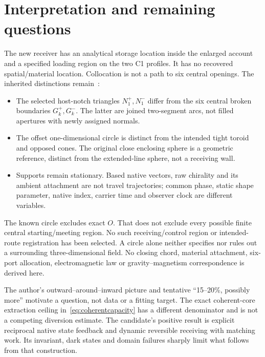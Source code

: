 \section{Interpretation and remaining questions}\label{sec:interpretation}
The new receiver has an analytical storage location inside the enlarged account and a specified loading region on the two C1 profiles. It has no recovered spatial/material location. Collocation is not a path to six central openings. The inherited distinctions remain~\cite{recirculation}:
\begin{itemize}
\item The selected host-notch triangles $N_1^+,N_1^-$ differ from the six central broken boundaries $G_k^+,G_k^-$. The latter are joined two-segment arcs, not filled apertures with newly assigned normals.
\item The offset one-dimensional circle is distinct from the intended tight toroid and opposed cones. The original close enclosing sphere is a geometric reference, distinct from the extended-line sphere, not a receiving wall.
\item Supports remain stationary. Based native vectors, raw chirality and its ambient attachment are not travel trajectories; common phase, static shape parameter, native index, carrier time and observer clock are different variables.
\end{itemize}
The known circle excludes exact $O$. That does not exclude every possible finite central starting/meeting region. No such receiving/control region or intended-route registration has been selected. A circle alone neither specifies nor rules out a surrounding three-dimensional field. No closing chord, material attachment, six-port allocation, electromagnetic law or gravity--magnetism correspondence is derived here.

The author's outward--around--inward picture and tentative ``15--20\%, possibly more'' motivate a question, not data or a fitting target. The exact coherent-core extraction ceiling in~\eqref{eq:coherentcapacity} has a different denominator and is not a competing diversion estimate. The candidate's positive result is explicit reciprocal native state feedback and dynamic reversible receiving with matching work. Its invariant, dark states and domain failures sharply limit what follows from that construction.

